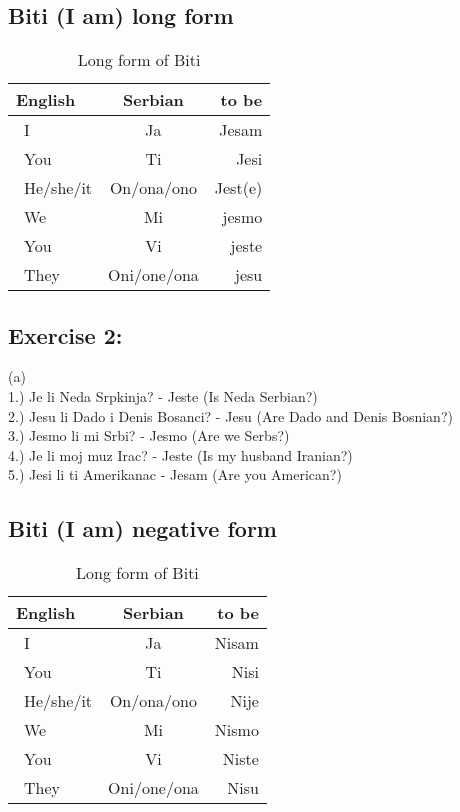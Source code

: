 \documentclass[12pt,
               a4paper,
               article,
               oneside,
               english,oldfontcommands]{memoir}
\newcommand{\spaze}{\vspace{4mm}\\}
\begin{document}
\subsection*{Biti (I am) long form}
  \begin{table}[H]
    \begin{center}
      \caption{Long form of Biti}
      \begin{tabular}{l|S|r}
        \toprule %
        \textbf{English} & \textbf{Serbian} & \textbf{to be}\\
        \midrule %
        \ I  & Ja & Jesam\\[4pt]
        \ You & Ti & Jesi \\[4pt]
        \ He/she/it & On/ona/ono & Jest(e)\\[4pt]
        \ We & Mi  & jesmo \\[4pt]
        \ You & Vi  & jeste \\[4pt]
        \ They & {Oni/one/ona}  & jesu \\[4pt]
        \bottomrule %
      \end{tabular}
    \end{center}
  \end{table}
  \subsection*{Exercise 2:} 
(a)\spaze 
1.) Je li Neda Srpkinja? - Jeste (Is Neda Serbian?)\spaze 
2.) Jesu li Dado i Denis Bosanci? - Jesu (Are Dado and Denis Bosnian?) \spaze 
3.) Jesmo li mi Srbi? -  Jesmo (Are we Serbs?) \spaze 
4.) Je li moj muz Irac? - Jeste (Is my husband Iranian?) \spaze 
5.) Jesi li ti Amerikanac - Jesam (Are you American?) 
\subsection*{Biti (I am) negative form}
  \begin{table}[H]
    \begin{center}
      \caption{Long form of Biti}
      \begin{tabular}{l|S|r}
        \toprule %
        \textbf{English} & \textbf{Serbian} & \textbf{to be}\\
        \midrule %
        \ I  & Ja & Nisam\\[4pt]
        \ You & Ti & Nisi \\[4pt]
        \ He/she/it & On/ona/ono & Nije\\[4pt]
        \ We & Mi  & Nismo \\[4pt]
        \ You & Vi  & Niste \\[4pt]
        \ They & {Oni/one/ona}  & Nisu \\[4pt]
        \bottomrule %
      \end{tabular}
    \end{center}
  \end{table}
\end{document}
